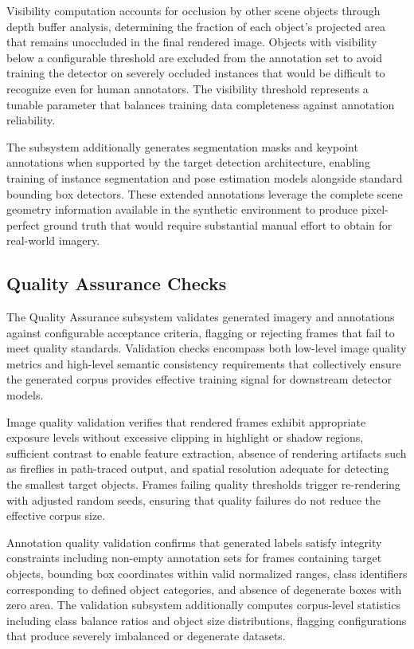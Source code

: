 Visibility computation accounts for occlusion by other scene objects through depth buffer analysis, determining the fraction of each object's projected area that remains unoccluded in the final rendered image. Objects with visibility below a configurable threshold are excluded from the annotation set to avoid training the detector on severely occluded instances that would be difficult to recognize even for human annotators. The visibility threshold represents a tunable parameter that balances training data completeness against annotation reliability.

The subsystem additionally generates segmentation masks and keypoint annotations when supported by the target detection architecture, enabling training of instance segmentation and pose estimation models alongside standard bounding box detectors. These extended annotations leverage the complete scene geometry information available in the synthetic environment to produce pixel-perfect ground truth that would require substantial manual effort to obtain for real-world imagery.

\subsection{Quality Assurance Checks}

The Quality Assurance subsystem validates generated imagery and annotations against configurable acceptance criteria, flagging or rejecting frames that fail to meet quality standards. Validation checks encompass both low-level image quality metrics and high-level semantic consistency requirements that collectively ensure the generated corpus provides effective training signal for downstream detector models.

Image quality validation verifies that rendered frames exhibit appropriate exposure levels without excessive clipping in highlight or shadow regions, sufficient contrast to enable feature extraction, absence of rendering artifacts such as fireflies in path-traced output, and spatial resolution adequate for detecting the smallest target objects. Frames failing quality thresholds trigger re-rendering with adjusted random seeds, ensuring that quality failures do not reduce the effective corpus size.

Annotation quality validation confirms that generated labels satisfy integrity constraints including non-empty annotation sets for frames containing target objects, bounding box coordinates within valid normalized ranges, class identifiers corresponding to defined object categories, and absence of degenerate boxes with zero area. The validation subsystem additionally computes corpus-level statistics including class balance ratios and object size distributions, flagging configurations that produce severely imbalanced or degenerate datasets.

